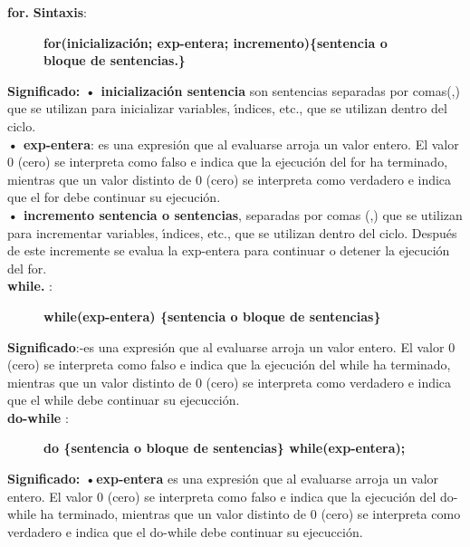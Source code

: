 \documentclass[a4paper]{article}
\begin{document}
\textbf{for.} \textbf{Sintaxis}:\\

\begin{figure}[H]
\centering
\textbf{for(inicialización; exp-entera; incremento)\{sentencia o bloque de sentencias.\}}\\
\end{figure}

\textbf{Significado: • inicialización sentencia} son  sentencias separadas por comas(,) que se utilizan para inicializar variables, ı́ndices, etc., que se utilizan dentro del ciclo. \\ 
\textbf{• exp-entera}: es una expresión que al evaluarse arroja un valor entero. El valor 0 (cero) se interpreta como falso e indica que la ejecución del for ha terminado, mientras que un valor distinto de 0 (cero) se interpreta como verdadero e indica que el for debe continuar su ejecución.\\ 
\textbf{• incremento sentencia o sentencias}, separadas por comas (,) que se utilizan para incrementar variables, ı́ndices, etc., que se
utilizan dentro del ciclo. Después de este incremente se evalua la exp-entera para continuar o detener la ejecución del for.\\



\textbf{while.} : \\ 

\begin{figure}[H]
\centering
\textbf{while(exp-entera) \{sentencia o bloque de sentencias\}}\\  
\end{figure}

\textbf{Significado}:-es una expresión que al evaluarse arroja un valor entero. El valor 0 (cero) se interpreta como falso e indica que la ejecución del while ha terminado, mientras que un valor distinto de 0 (cero) se interpreta como verdadero e indica que el while debe continuar su ejecucción. \\

\textbf{do-while} :

\begin{figure}[H]
	\centering
\textbf{do \{sentencia o bloque de sentencias\} while(exp-entera);}
\end{figure}

\textbf{Significado: •exp-entera} es una expresión que al evaluarse arroja un valor entero. El valor 0 (cero) se interpreta como falso e indica que la ejecución del do-while ha terminado,
mientras que un valor distinto de 0 (cero) se interpreta como verdadero e indica que el do-while debe continuar su ejecucción.\\ 
\end{document}

